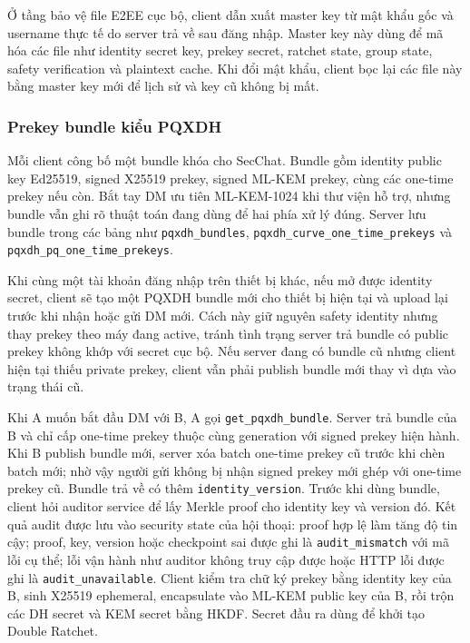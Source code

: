 Ở tầng bảo vệ file E2EE cục bộ, client dẫn xuất master key từ mật khẩu gốc và username thực tế do server trả về sau đăng nhập. Master key này dùng để mã hóa các file như identity secret key, prekey secret, ratchet state, group state, safety verification và plaintext cache. Khi đổi mật khẩu, client bọc lại các file này bằng master key mới để lịch sử và key cũ không bị mất.

\subsubsection{Prekey bundle kiểu PQXDH}

Mỗi client công bố một bundle khóa cho SecChat. Bundle gồm identity public key Ed25519, signed X25519 prekey, signed ML-KEM prekey, cùng các one-time prekey nếu còn. Bắt tay DM ưu tiên ML-KEM-1024 khi thư viện hỗ trợ, nhưng bundle vẫn ghi rõ thuật toán đang dùng để hai phía xử lý đúng. Server lưu bundle trong các bảng như \texttt{pqxdh\_bundles}, \texttt{pqxdh\_curve\_one\_time\_prekeys} và \texttt{pqxdh\_pq\_one\_time\_prekeys}.

Khi cùng một tài khoản đăng nhập trên thiết bị khác, nếu mở được identity secret, client sẽ tạo một PQXDH bundle mới cho thiết bị hiện tại và upload lại trước khi nhận hoặc gửi DM mới. Cách này giữ nguyên safety identity nhưng thay prekey theo máy đang active, tránh tình trạng server trả bundle có public prekey không khớp với secret cục bộ. Nếu server đang có bundle cũ nhưng client hiện tại thiếu private prekey, client vẫn phải publish bundle mới thay vì dựa vào trạng thái cũ.

Khi A muốn bắt đầu DM với B, A gọi \texttt{get\_pqxdh\_bundle}. Server trả bundle của B và chỉ cấp one-time prekey thuộc cùng generation với signed prekey hiện hành. Khi B publish bundle mới, server xóa batch one-time prekey cũ trước khi chèn batch mới; nhờ vậy người gửi không bị nhận signed prekey mới ghép với one-time prekey cũ. Bundle trả về có thêm \texttt{identity\_version}. Trước khi dùng bundle, client hỏi auditor service để lấy Merkle proof cho identity key và version đó. Kết quả audit được lưu vào security state của hội thoại: proof hợp lệ làm tăng độ tin cậy; proof, key, version hoặc checkpoint sai được ghi là \texttt{audit\_mismatch} với mã lỗi cụ thể; lỗi vận hành như auditor không truy cập được hoặc HTTP lỗi được ghi là \texttt{audit\_unavailable}. Client kiểm tra chữ ký prekey bằng identity key của B, sinh X25519 ephemeral, encapsulate vào ML-KEM public key của B, rồi trộn các DH secret và KEM secret bằng HKDF. Secret đầu ra dùng để khởi tạo Double Ratchet.

